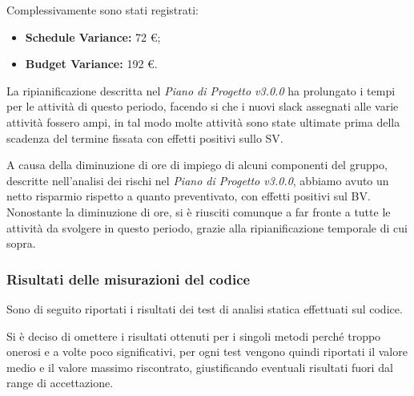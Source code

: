 \noindent Complessivamente sono stati registrati:
\begin{itemize}
	\item \textbf{Schedule Variance:} 72 \euro;
	\item \textbf{Budget Variance:} 192 \euro.
\end{itemize}

\noindent La ripianificazione descritta nel \textit{Piano di Progetto v3.0.0} ha prolungato i tempi per le attività di questo periodo, facendo si che i nuovi \gls{slack} assegnati alle varie attività fossero ampi, in tal modo molte attività sono state ultimate prima della scadenza del termine fissata con effetti positivi sullo SV.

\noindent A causa della diminuzione di ore di impiego di alcuni componenti del gruppo, descritte nell'analisi dei rischi nel \textit{Piano di Progetto v3.0.0}, abbiamo avuto un netto risparmio rispetto a quanto preventivato, con effetti positivi sul BV. Nonostante la diminuzione di ore, si è riusciti comunque a far fronte a tutte le attività da svolgere in questo periodo, grazie alla ripianificazione temporale di cui sopra.  

\subsubsection{Risultati delle misurazioni del codice}
\label{appendice 7}
\vspace{3mm}

Sono di seguito riportati i risultati dei test di analisi statica effettuati sul codice.

Si è deciso di omettere i risultati ottenuti per i singoli metodi perché troppo onerosi e a volte poco significativi, per ogni test vengono quindi riportati il valore medio e il valore massimo riscontrato, giustificando eventuali risultati fuori dal range di accettazione.


